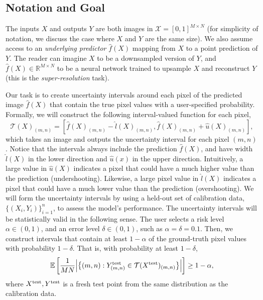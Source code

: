 \documentclass[10pt]{article}
\def\R{\mathbb{R}}
\def\E{\mathbb{E}}
\newcommand{\T}{\mathcal{T}}
\begin{document}
\subsection{Notation and Goal}
\label{subsec:notation}
The inputs $X$ and outputs $Y$ are both images in $\mathcal{X} = [0,1]^{M \times N}$ (for simplicity of notation, we discuss the case where $X$ and $Y$ are the same size).
We also assume access to an \emph{underlying predictor} $\hat{f}(X)$ mapping from $X$ to a point prediction of $Y$.
The reader can imagine $X$ to be a downsampled version of $Y$, and $\hat{f}(X) \in \R^{M \times N}$ to be a neural network trained to upsample $X$ and reconstruct $Y$ (this is the \emph{super-resolution} task).

Our task is to create uncertainty intervals around each pixel of the predicted image $\hat{f}(X)$ that contain the true pixel values with a user-specified probability. 
Formally, we will construct the following interval-valued function for each pixel,
\begin{equation}
    \label{eq:nested-sets}
    \T(X)_{(m,n)} = \left[\hat{f}(X)_{(m,n)}-\hat{l}(X)_{(m,n)}, \hat{f}(X)_{(m,n)} + \hat{u}(X)_{(m,n)} \right],
\end{equation}
which takes an image and outputs the uncertainty interval for each pixel $(m,n)$.
Notice that the intervals always include the prediction $\hat{f}(X)$, and have width $\hat{l}(X)$
in the lower direction and $\hat{u}(x)$ in the upper direction. 
Intuitively, a large value in $\hat{u}(X)$ indicates a pixel that could have a much higher value than the prediction (undershooting).
Likewise, a large pixel value in $\hat{l}(X)$ indicates a pixel that could have a much lower value than the prediction (overshooting).
We will form the uncertainty intervals by using a held-out set of calibration data, $\{(X_i,Y_i)\}_{i=1}^n$, to assess the model's performance.
The uncertainty intervals will be statistically valid in the following sense. 
The user selects a risk level $\alpha \in (0,1)$, and an error level $\delta \in (0,1)$, such as $\alpha = \delta = 0.1$. 
Then, we construct intervals that contain at least $1-\alpha$ of the ground-truth pixel values with probability $1-\delta$. 
That is, with probability at least $1-\delta$,
\begin{equation*}
    \E\left[\frac{1}{MN}\Big|\big\{(m,n) : Y^{\rm test}_{(m,n)} \in \T(X^{\rm test})_{(m,n)}\big\}\Big|\right] \ge 1 - \alpha,
\end{equation*}
where $X^{\rm test}, Y^{\rm test}$ is a fresh test point from the same distribution as the calibration data. 
\end{document}
